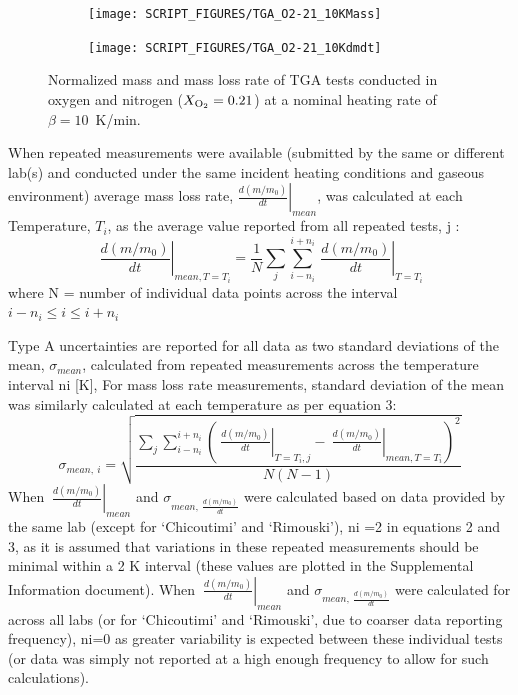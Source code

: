 \documentclass{book}
\begin{document}
\begin{figure}
\centering
\begin{subfigure}[b]{0.85\textwidth}
   \texttt{[image: SCRIPT\_FIGURES/TGA\_O2-21\_10KMass]}
   \caption{}
   \label{Fig:TGA_O2-21_10KMass} 
\end{subfigure}

\begin{subfigure}[b]{0.85\textwidth}
   \texttt{[image: SCRIPT\_FIGURES/TGA\_O2-21\_10Kdmdt]}
   \caption{}
   \label{Fig:TGA_O2-21_10Kdmdt} 
\end{subfigure}
  
  \caption{Normalized mass and mass loss rate of TGA tests conducted in oxygen and nitrogen ($X_{\rm O_2}=0.21$) at a nominal heating rate of $\beta=10$~K/min.}
  \label{Fig:TGA_O2-21_10K}
\end{figure}



When repeated measurements were available (submitted by the same or different lab(s) and conducted under the same incident heating conditions and gaseous environment) average mass loss rate, $\left.\frac{d\left(m/m_0\right)}{dt}\right|_{mean}$, was calculated at each Temperature, $T_i$, as the average value reported from all repeated tests, j :
\begin{equation}
\left.\ \frac{d\left(m/m_0\right)}{dt}\right|_{mean,T=T_i}=\frac{1}{N}\sum_{j}\sum_{i-n_i}^{i+n_i}\left.\ \frac{d\left(m/m_0\right)}{dt}\right|_{T=T_i}
\end{equation}
where N = number of individual data points across the interval $i-n_i\le i\le i+n_i$

Type A uncertainties are reported for all data as two standard deviations of the mean, $\sigma_{mean}$, calculated from repeated measurements across the temperature interval ni [K], For mass loss rate measurements, standard deviation of the mean was similarly calculated at each temperature as per equation 3:
\begin{equation}
  \sigma_{mean,\ i}=\sqrt{\frac{\sum_{j}\sum_{i-n_i}^{i+n_i}\left(\left.\ \frac{d\left(m/m_0\right)}{dt}\right|_{T=T_i,j}-\left.\ \frac{d\left(m/m_0\right)}{dt}\right|_{mean,T=T_i}\right)^2}{N\left(N-1\right)}}
\end{equation}
When $\left.\ \frac{d\left(m/m_0\right)}{dt}\right|_{mean}$ and $\sigma_{mean,\ \frac{d\left(m/m_0\right)}{dt}}$ were calculated based on data provided by the same lab (except for ‘Chicoutimi’ and ‘Rimouski’), ni =2 in equations 2 and 3, as it is assumed that variations in these repeated measurements should be minimal within a 2 K interval (these values are plotted in the Supplemental Information document). When $\left.\ \frac{d\left(m/m_0\right)}{dt}\right|_{mean}$ and $\sigma_{mean,\ \frac{d\left(m/m_0\right)}{dt}}$  were calculated for across all labs (or for ‘Chicoutimi’ and ‘Rimouski’, due to coarser data reporting frequency), ni=0 as greater variability is expected between these individual tests (or data was simply not reported at a high enough frequency to allow for such calculations).
\end{document}
